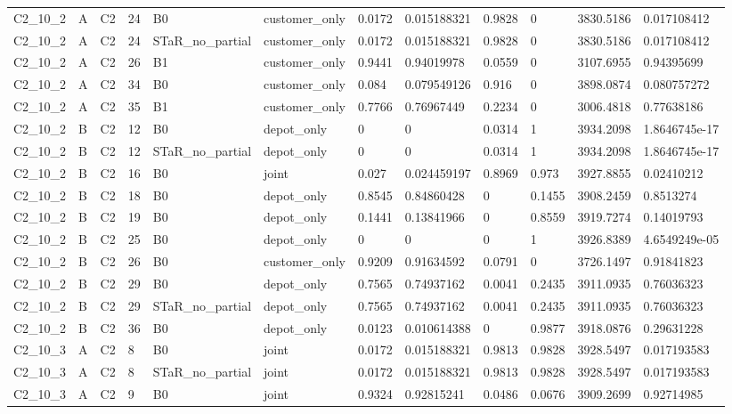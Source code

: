 \begin{longtable}{llllllllllll}
C2\_10\_2 & A & C2 & 24 & B0 & customer\_only & 0.0172 & 0.015188321 & 0.9828 & 0 & 3830.5186 & 0.017108412 \\
C2\_10\_2 & A & C2 & 24 & STaR\_no\_partial & customer\_only & 0.0172 & 0.015188321 & 0.9828 & 0 & 3830.5186 & 0.017108412 \\
C2\_10\_2 & A & C2 & 26 & B1 & customer\_only & 0.9441 & 0.94019978 & 0.0559 & 0 & 3107.6955 & 0.94395699 \\
C2\_10\_2 & A & C2 & 34 & B0 & customer\_only & 0.084 & 0.079549126 & 0.916 & 0 & 3898.0874 & 0.080757272 \\
C2\_10\_2 & A & C2 & 35 & B1 & customer\_only & 0.7766 & 0.76967449 & 0.2234 & 0 & 3006.4818 & 0.77638186 \\
C2\_10\_2 & B & C2 & 12 & B0 & depot\_only & 0 & 0 & 0.0314 & 1 & 3934.2098 & 1.8646745e-17 \\
C2\_10\_2 & B & C2 & 12 & STaR\_no\_partial & depot\_only & 0 & 0 & 0.0314 & 1 & 3934.2098 & 1.8646745e-17 \\
C2\_10\_2 & B & C2 & 16 & B0 & joint & 0.027 & 0.024459197 & 0.8969 & 0.973 & 3927.8855 & 0.02410212 \\
C2\_10\_2 & B & C2 & 18 & B0 & depot\_only & 0.8545 & 0.84860428 & 0 & 0.1455 & 3908.2459 & 0.8513274 \\
C2\_10\_2 & B & C2 & 19 & B0 & depot\_only & 0.1441 & 0.13841966 & 0 & 0.8559 & 3919.7274 & 0.14019793 \\
C2\_10\_2 & B & C2 & 25 & B0 & depot\_only & 0 & 0 & 0 & 1 & 3926.8389 & 4.6549249e-05 \\
C2\_10\_2 & B & C2 & 26 & B0 & customer\_only & 0.9209 & 0.91634592 & 0.0791 & 0 & 3726.1497 & 0.91841823 \\
C2\_10\_2 & B & C2 & 29 & B0 & depot\_only & 0.7565 & 0.74937162 & 0.0041 & 0.2435 & 3911.0935 & 0.76036323 \\
C2\_10\_2 & B & C2 & 29 & STaR\_no\_partial & depot\_only & 0.7565 & 0.74937162 & 0.0041 & 0.2435 & 3911.0935 & 0.76036323 \\
C2\_10\_2 & B & C2 & 36 & B0 & depot\_only & 0.0123 & 0.010614388 & 0 & 0.9877 & 3918.0876 & 0.29631228 \\
C2\_10\_3 & A & C2 & 8 & B0 & joint & 0.0172 & 0.015188321 & 0.9813 & 0.9828 & 3928.5497 & 0.017193583 \\
C2\_10\_3 & A & C2 & 8 & STaR\_no\_partial & joint & 0.0172 & 0.015188321 & 0.9813 & 0.9828 & 3928.5497 & 0.017193583 \\
C2\_10\_3 & A & C2 & 9 & B0 & joint & 0.9324 & 0.92815241 & 0.0486 & 0.0676 & 3909.2699 & 0.92714985 \\

\end{longtable}
